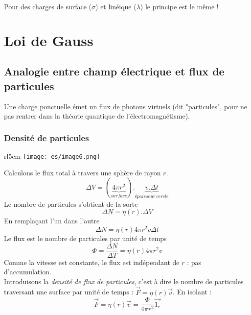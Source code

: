 \documentclass[british,french,11pt, a4paper, openany]{book}
\begin{document}
Pour des charges de surface ($\sigma$) et linéique ($\lambda$) le principe est le même ! 


\section{Loi de Gauss}
\subsection{Analogie entre champ électrique et flux de particules}
Une charge ponctuelle émet un flux de photons virtuels (dit "particules", pour ne pas rentrer dans la théorie quantique de l'électromagnétisme).

\subsubsection{Densité de particules}
\begin{wrapfigure}[7]{rl}{5cm}
	\texttt{[image: es/image6.png]}
\end{wrapfigure}
Calculons le flux total à travers une sphère de rayon $r$.
\begin{equation}
	\Delta V = \left(\underbrace{4\pi r^2}_{surface}\right) . \underbrace{v.\Delta t}_{épaisseur\ cercle}
\end{equation}
Le nombre de particules s'obtient de la sorte
\begin{equation}
	\Delta N = \eta(r).\Delta V
\end{equation}
En remplaçant l'un dans l'autre
\begin{equation}
	\Delta N = \eta (r) 4\pi r^2 v\Delta t
\end{equation}
Le flux est le nombre de particules par unité de temps 
\begin{equation}
	\Phi = \frac{\Delta N}{\Delta T} = \eta (r) 4\pi r^2 v
\end{equation}
Comme la vitesse est constante, le flux est indépendant de $r$ : pas d'accumulation.\\

Introduisons la \textit{densité de flux de particules}, c'est à dire le nombre de particules traversant une surface par unité de temps : $\vec{F} = \eta (r)\vec{v}$. En isolant :
\begin{equation}
	\vec{F} = \eta (r)\vec{v} = \frac{\Phi}{4\pi r^2}\vec{1_r}
\end{equation}
\end{document}
